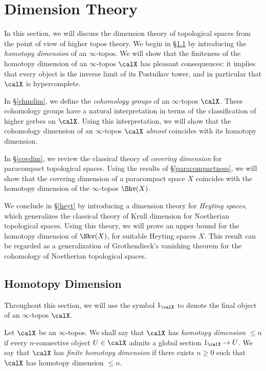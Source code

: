 \section{Dimension Theory}\label{dimension}

\setcounter{theorem}{0}


In this section, we will discuss the dimension theory of
topological spaces from the point of view of higher topos theory. We
begin in \S \ref{homdim} by introducing the {\it homotopy dimension} of an $\infty$-topos. We will show that the finiteness
of the homotopy dimension of an $\infty$-topos $\calX$ has pleasant
consequences: it implies that every object is the inverse limit of
its Postnikov tower, and in particular that $\calX$ is hypercomplete.

In \S \ref{chmdim}, we define the {\it cohomology groups} of an $\infty$-topos $\calX$. These cohomology groups have a natural interpretation in terms of the classification of higher gerbes on $\calX$. Using this interpretation, we will show that the cohomology dimension of an $\infty$-topos $\calX$ {\em almost} coincides with its homotopy dimension.

In \S \ref{covdim}, we review the classical theory of {\it covering dimension} for paracompact topological spaces. Using the results of \S \ref{paracompactness}, we will show that the covering dimension of a paracompact space $X$ coincides with the homotopy dimension of the $\infty$-topos $\Shv(X)$.

We conclude in \S \ref{heyt} by introducing a dimension theory for {\em Heyting spaces}, which generalizes the classical theory of Krull dimension for Noetherian topological spaces. Using this theory, we will prove an upper bound for the homotopy dimension of $\Shv(X)$, for suitable Heyting spaces $X$. This result can be regarded as a generalization of Grothendieck's vanishing theorem for the cohomology of Noetherian topological spaces.

\subsection{Homotopy Dimension}\label{homdim}

Throughout this section, we will use the symbol $1_{\calX}$ to denote the final object of an $\infty$-topos
$\calX$.

\begin{definition}\label{sugarpie}
Let $\calX$ be an $\infty$-topos. We shall say that $\calX$ has
{\it homotopy dimension $\leq n$} if every $n$-connective
object $U \in \calX$ admits a global section $1_{\calX} \rightarrow U$. We
say that $\calX$ has {\it finite homotopy dimension} if there
exists $n \geq 0$ such that $\calX$ has homotopy dimension $\leq
n$.
\end{definition}

